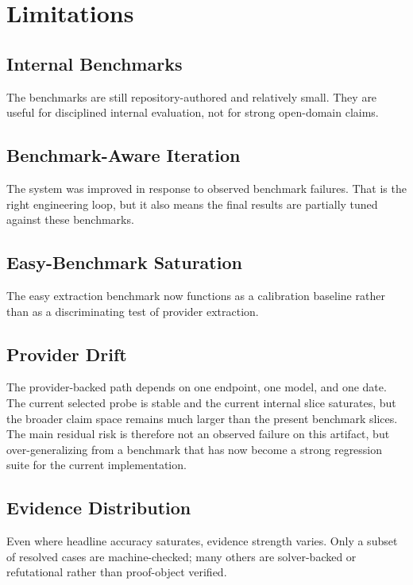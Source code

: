 \documentclass[11pt]{article}
\begin{document}
\section{Limitations}

\subsection{Internal Benchmarks}

The benchmarks are still repository-authored and relatively small. They are
useful for disciplined internal evaluation, not for strong open-domain claims.

\subsection{Benchmark-Aware Iteration}

The system was improved in response to observed benchmark failures. That is the
right engineering loop, but it also means the final results are partially tuned
against these benchmarks.

\subsection{Easy-Benchmark Saturation}

The easy extraction benchmark now functions as a calibration baseline rather
than as a discriminating test of provider extraction.

\subsection{Provider Drift}

The provider-backed path depends on one endpoint, one model, and one date.
The current selected probe is stable and the current internal slice saturates,
but the broader claim space remains much larger than the present benchmark
slices. The main residual risk is therefore not an observed failure on this
artifact, but over-generalizing from a benchmark that has now become a strong
regression suite for the current implementation.

\subsection{Evidence Distribution}

Even where headline accuracy saturates, evidence strength varies. Only a subset
of resolved cases are machine-checked; many others are solver-backed or
refutational rather than proof-object verified.
\end{document}
